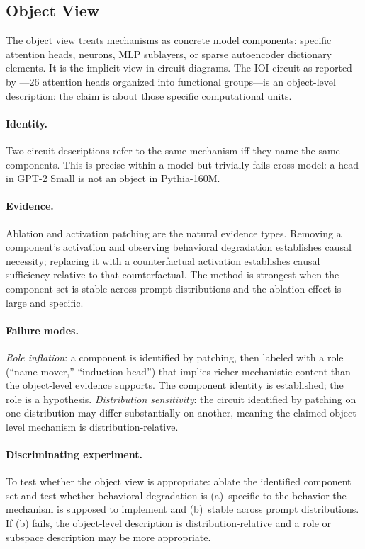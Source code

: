 \documentclass{article}
\begin{document}
\subsection{Object View}

The object view treats mechanisms as concrete model components: specific
attention heads, neurons, MLP sublayers, or sparse autoencoder dictionary
elements.  It is the implicit view in circuit diagrams.  The IOI circuit
as reported by \citet{wang2022}---26 attention heads organized into
functional groups---is an object-level description: the claim is about
those specific computational units.

\paragraph{Identity.}
Two circuit descriptions refer to the same mechanism iff they name the
same components.  This is precise within a model but trivially fails
cross-model: a head in GPT-2 Small is not an object in Pythia-160M.

\paragraph{Evidence.}
Ablation and activation patching are the natural evidence types.  Removing
a component's activation and observing behavioral degradation establishes
causal necessity; replacing it with a counterfactual activation establishes
causal sufficiency relative to that counterfactual.  The method is
strongest when the component set is stable across prompt distributions
and the ablation effect is large and specific.

\paragraph{Failure modes.}
\emph{Role inflation}: a component is identified by patching, then labeled
with a role (``name mover,'' ``induction head'') that implies richer
mechanistic content than the object-level evidence supports.  The component
identity is established; the role is a hypothesis.  \emph{Distribution
sensitivity}: the circuit identified by patching on one distribution may
differ substantially on another, meaning the claimed object-level mechanism
is distribution-relative.

\paragraph{Discriminating experiment.}
To test whether the object view is appropriate: ablate the identified
component set and test whether behavioral degradation is (a)~specific to
the behavior the mechanism is supposed to implement and (b)~stable across
prompt distributions.  If (b) fails, the object-level description is
distribution-relative and a role or subspace description may be more
appropriate.
\end{document}
